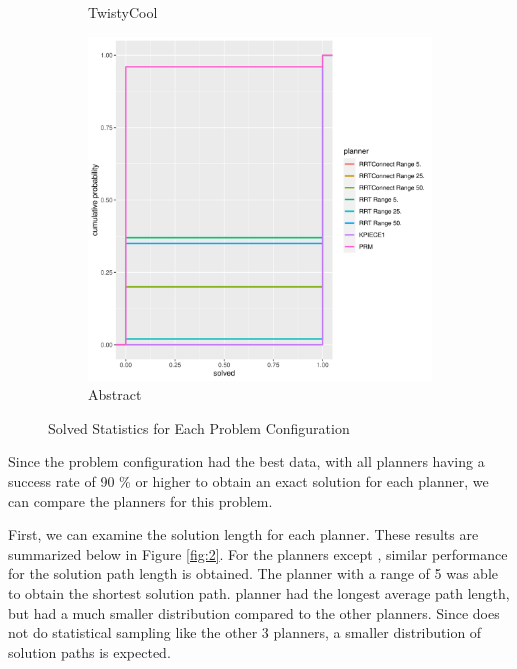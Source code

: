 \documentclass[11pt]{article}
\newcommand{\forceindent}{\leavevmode{\parindent=1em\indent}}
\begin{document}
\begin{enumerate}[leftmargin=0.3in]
\begin{enumerate}[leftmargin=0.3in]
\begin{figure}[H]
\begin{subfigure}[b]{0.3\textwidth}
              \caption{TwistyCool}
           \end{subfigure}
           \begin{subfigure}[b]{0.3\textwidth}
              \centering
              \includegraphics[width=\textwidth]{figures/abstract_solved-1.png}
              \caption{Abstract}
           \end{subfigure}
       \caption{Solved Statistics for Each Problem Configuration}
       \label{fig:1}
       \end{figure}

  \forceindent Since the  problem configuration had the best data, with all planners having a success rate of 90 \% or higher to obtain an exact solution for each planner, we can compare the planners for this problem.

  \forceindent First, we can examine the solution length for each planner. These results are summarized below in Figure \ref{fig:2}. For the planners except , similar performance for the solution path length is obtained. The  planner with a range of 5 was able to obtain the shortest solution path.  planner had the longest average path length, but had a much smaller distribution compared to the other planners. Since  does not do statistical sampling like the other 3 planners, a smaller distribution of solution paths is expected.


\end{enumerate}
\end{enumerate}
\end{document}
